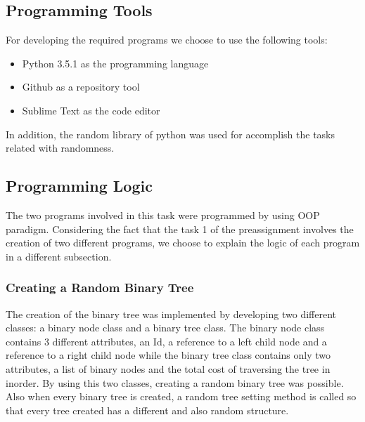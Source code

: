 \documentclass[12p]{article}
\begin{document}
  \subsection{Programming Tools}
For developing the required programs we choose to use the following tools:

\begin{itemize}
  \item Python 3.5.1 as the programming language
  \item Github as a repository tool
  \item Sublime Text as the code editor
\end{itemize}

In addition, the random library of python was used for accomplish the tasks related with randomness.



  \subsection{Programming Logic}
The two programs involved in this task were programmed by using OOP paradigm.
Considering the fact that the task 1 of the preassignment involves the creation of two different programs, we choose to explain the logic of each program in a different subsection. 


  \subsubsection{Creating a Random Binary Tree}

The creation of the binary tree was implemented by developing two different classes: a binary node class and a binary tree class. The binary node class contains 3 different attributes, an Id, a reference to a left child node and a reference to a right child node while the binary tree class contains only two attributes, a list of binary nodes and the total cost of traversing the tree in inorder. By using this two classes, creating a random binary tree was possible. Also when every binary tree is created, a random tree setting method is called so that every tree created has a different and also random structure.

\bigskip
\end{document}
